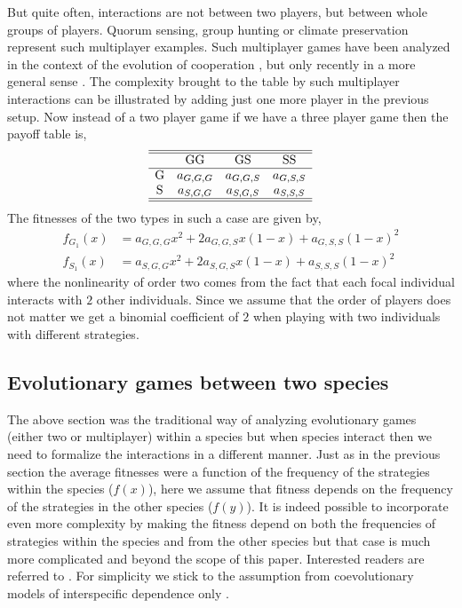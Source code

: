 \documentclass[12pt]{article}
\begin{document}
But quite often, interactions are not between two players, but between whole groups of players. 
Quorum sensing,  group hunting or climate preservation represent such multiplayer examples.
Such multiplayer games have been analyzed in the context of the evolution of cooperation \cite{hardin:Science:1968,hauert:PRSB:1997,kollock:ARS:1998,rockenbach:Nature:2006,milinski:PNAS:2006,milinski:PNAS:2008}, but only recently in a  more general sense \cite{pacheco:PRSB:2009,kurokawa:PRSB:2009,souza:JTB:2009,gokhale:PNAS:2010}.
The complexity brought to the table by such multiplayer interactions can be illustrated by adding just one more player in the previous setup.
Now instead of a two player game if we have a three player game then the payoff table is,
%
\begin{equation}\label{eq:threepl}
\begin{array}{cccc}
\hline\hline
 &$GG$	&	$GS$		&	$SS$\\
\hline
$G$ 	& a_{G,G,G} &	a_{G,G,S} &	a_{G,S,S} 
 \\
 $S$ 	&  a_{S,G,G} &a_{S,G,S}  &a_{S,S,S} \nonumber \\
 \hline\hline
\end{array}
\end{equation}
%
The fitnesses of the two types in such a case are given by,
\begin{eqnarray}
f_{G_1} (x) &= a_{G,G,G} x^2 + 2 a_{G,G,S} x (1-x) + a_{G,S,S} (1-x)^2 \nonumber \\
f_{S_1} (x) &= a_{S,G,G} x^2 + 2 a_{S,G,S} x (1-x) + a_{S,S,S} (1-x)^2 \nonumber
\end{eqnarray}
where the nonlinearity of order two comes from the fact that each focal individual interacts with $2$ other individuals.
Since we assume that the order of players does not matter we get a binomial coefficient of $2$ when playing with two individuals with different strategies. 

\subsection*{Evolutionary games between two species}
The above section was the traditional way of analyzing evolutionary games (either two or multiplayer) within a species but when species interact then we need to formalize the interactions in a different manner.
Just as in the previous section the average fitnesses were a function of the frequency of the strategies within the species ($f(x)$), here we assume that fitness depends on the frequency of the strategies in the other species ($f(y)$).
It is indeed possible to incorporate even more complexity by making the fitness depend on both the frequencies of strategies within the species and from the other species but that case is much more complicated and beyond the scope of this paper. 
Interested readers are referred to \cite{schuster:BC:1981c}.
For simplicity we stick to the assumption from coevolutionary models of interspecific dependence only \cite{roughgarden:TPB:1976,roughgarden:book:1983}.
\end{document}
